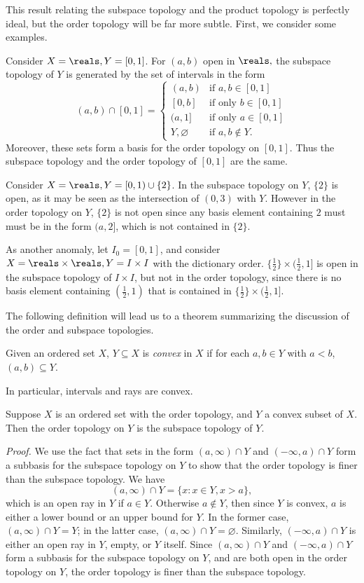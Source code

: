 This result relating the subspace topology and the product topology is perfectly ideal, but the order topology will be far more subtle. First, we consider some examples.

Consider $X = \reals, Y = [0, 1]$. For $(a, b)$ open in $\reals,$ the subspace topology of $Y$ is generated by the set of intervals in the form
$$(a, b) \cap [0, 1] = \begin{cases}
    (a, b) &\text{if }a, b \in [0, 1] \\
    [0, b] &\text{if only } b \in [0, 1] \\
    (a, 1] &\text{if only } a\in [0, 1] \\
    Y, \varnothing &\text{if }a, b \notin Y.
\end{cases}$$
Moreover, these sets form a basis for the order topology on $[0, 1]$. Thus the subspace topology and the order topology of $[0, 1]$ are the same.

Consider $X = \reals, Y= [0, 1) \cup \{2\}$. In the subspace topology on $Y$, $\{2\}$ is open, as it may be seen as the intersection of $(0, 3)$ with $Y$. However in the order topology on $Y$, $\{2\}$ is not open since any basis element containing $2$ must must be in the form $(a, 2]$, which is not contained in $\{2\}$.

As another anomaly, let $I_0 = [0, 1]$, and consider $X = \reals \times \reals, Y = I \times I$ with the dictionary order. $\{\frac12\} \times (\frac12, 1]$ is open in the subspace topology of $I \times I$, but not in the order topology, since there is no basis element containing $(\frac12, 1)$ that is contained in $\{\frac12\} \times (\frac12, 1]$.

The following definition will lead us to a theorem summarizing the discussion of the order and subspace topologies.
\begin{definition}\label{2.17}
    Given an ordered set $X$, $Y \subseteq X$ is {\it convex} in $X$ if for each $a, b \in Y$ with $a< b$, $(a, b) \subseteq Y$.    
\end{definition}
In particular, intervals and rays are convex.

\begin{theorem}\label{2.18}
    Suppose $X$ is an ordered set with the order topology, and $Y$ a convex subset of $X$. Then the order topology on $Y$ is the subspace topology of $Y$.
\end{theorem}
{\it Proof.} We use the fact that sets in the form $(a, \infty) \cap Y$ and $(-\infty, a) \cap Y$ form a subbasis for the subspace topology on $Y$ to show that the order topology is finer than the subspace topology. We have
$$(a, \infty) \cap Y = \{x : x \in Y, x > a\},$$
which is an open ray in $Y$ if $a \in Y.$ Otherwise $a \notin Y$, then since $Y$ is convex, $a$ is either a lower bound or an upper bound for $Y$. In the former case, $(a, \infty) \cap Y = Y$; in the latter case, $(a, \infty) \cap Y = \varnothing$. Similarly, $(-\infty, a) \cap Y$ is either an open ray in $Y$, empty, or $Y$ itself. Since $(a, \infty) \cap Y$ and $(-\infty, a) \cap Y$ form a subbasis for the subspace topology on $Y$, and are both open in the order topology on $Y$, the order topology is finer than the subspace topology.

